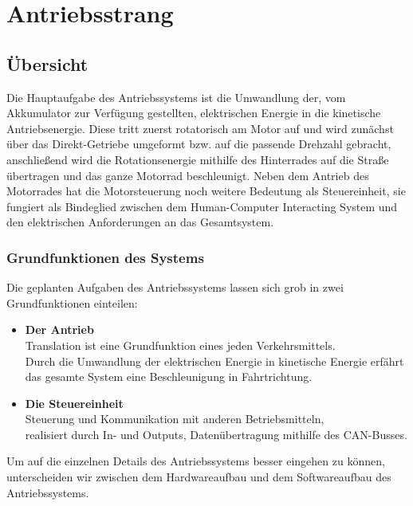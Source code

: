 \chapter{Antriebsstrang}  \label{Antriebsstrang}

\section{Übersicht}
Die Hauptaufgabe des Antriebssystems ist die Umwandlung der, vom Akkumulator zur Verfügung gestellten, elektrischen Energie in die kinetische Antriebsenergie. Diese tritt zuerst rotatorisch am Motor auf und wird zunächst über das Direkt-Getriebe umgeformt bzw. auf die passende Drehzahl gebracht, anschließend wird die Rotationsenergie mithilfe des Hinterrades auf die Straße übertragen und das ganze Motorrad beschleunigt. Neben dem Antrieb des Motorrades hat die Motorsteuerung noch weitere Bedeutung als Steuereinheit, sie fungiert als Bindeglied zwischen dem Human-Computer Interacting System und den elektrischen Anforderungen an das Gesamtsystem.


\subsection{Grundfunktionen des Systems}
Die geplanten Aufgaben des Antriebssystems lassen sich grob in zwei Grundfunktionen einteilen:

\begin{itemize}
	\item \textbf{Der Antrieb} 
	\\ \medskip Translation ist eine Grundfunktion eines jeden Verkehrsmittels.
	\\ Durch die Umwandlung der elektrischen Energie in kinetische Energie erfährt 
	\\ das gesamte System eine Beschleunigung in Fahrtrichtung.
	\medskip
	\item \textbf{Die Steuereinheit}
	\\ \medskip Steuerung und Kommunikation mit anderen Betriebsmitteln,
	\\ realisiert durch In- und Outputs, Datenübertragung mithilfe des CAN-Busses. 
\end{itemize}

\vspace{5mm}

Um auf die einzelnen Details des Antriebssystems besser eingehen zu können, unterscheiden wir zwischen dem Hardwareaufbau und dem Softwareaufbau des Antriebssystems.

